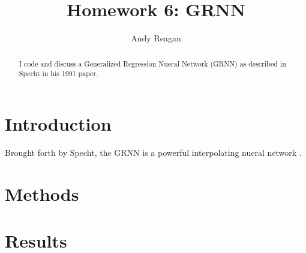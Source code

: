 \documentclass[pre,twocolumn,twoside,byrevtex,superscriptaddress]{revtex4}
\begin{document}




\title{\vspace{-2cm}Homework 6: GRNN}
\author{Andy Reagan}

\begin{abstract}
I code and discuss a Generalized Regression Nueral Network (GRNN) as described in Specht in his 1991 paper.
\end{abstract}

\maketitle

\section{Introduction}

Brought forth by Specht, the GRNN is a powerful interpolating nueral network \cite{specht1991a}.




\section{Methods}



\section{Results}
\end{document}

